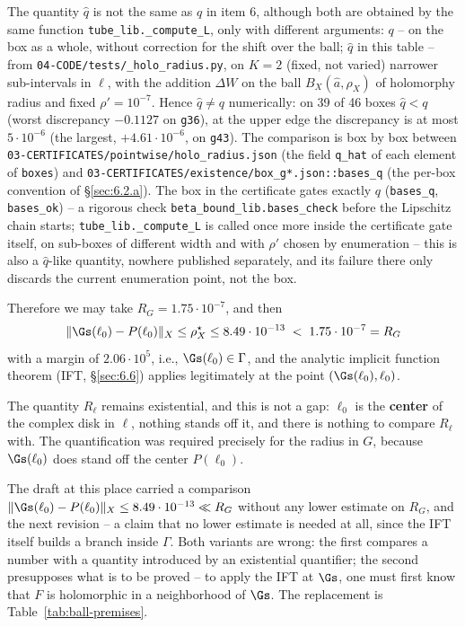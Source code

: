 The quantity $\hat q$ is not the same as $q$ in item 6, although both are obtained by the same function \texttt{tube\_\allowbreak lib.\_\allowbreak compute\_\allowbreak L}, only with different arguments: $q$ -- on the box as a whole, without correction for the shift over the ball; $\hat q$ in this table -- from \texttt{04-\allowbreak CODE/\allowbreak tests/\allowbreak \_\allowbreak holo\_\allowbreak radius.py}, on $K=2$ (fixed, not varied) narrower sub-intervals in $\ell$, with the addition $\Delta W$ on the ball $B_X(\hat a,\rho_X)$ of holomorphy radius and fixed $\rho'=10^{-7}$. Hence $\hat q\ne q$ numerically: on 39 of 46 boxes $\hat q<q$ (worst discrepancy $-0.1127$ on \texttt{g36}), at the upper edge the discrepancy is at most $5\cdot10^{-6}$ (the largest, $+4.61\cdot10^{-6}$, on \texttt{g43}). The comparison is box by box between \texttt{03-\allowbreak CERTIFICATES/\allowbreak pointwise/\allowbreak holo\_\allowbreak radius.json} (the field \texttt{q\_\allowbreak hat} of each element of \texttt{boxes}) and \texttt{03-\allowbreak CERTIFICATES/\allowbreak existence/\allowbreak box\_\allowbreak g*.json\allowbreak ::\allowbreak bases\_\allowbreak q} (the per-box convention of \S\ref{sec:6.2.a}). The box in the certificate gates exactly $q$ (\texttt{bases\_q}, \texttt{bases\_ok}) -- a rigorous check \texttt{beta\_\allowbreak bound\_\allowbreak lib.bases\_\allowbreak check} before the Lipschitz chain starts; \texttt{tube\_\allowbreak lib.\_\allowbreak compute\_\allowbreak L} is called once more inside the certificate gate itself, on sub-boxes of different width and with $\rho'$ chosen by enumeration -- this is also a $\hat q$-like quantity, nowhere published separately, and its failure there only discards the current enumeration point, not the box.

Therefore we may take $R_G=1.75\cdot10^{-7}$, and then
\[
\|\Gs(\ell_0)-P(\ell_0)\|_X\le\rho^{\star}_X\le8.49\cdot10^{-13}
\;<\;1.75\cdot10^{-7}=R_G
\]
with a margin of $2.06\cdot10^{5}$, i.e., $\Gs(\ell_0)\in\Gamma$, and
the analytic implicit function theorem (IFT, \S\ref{sec:6.6}) applies legitimately at the point $(\Gs(\ell_0),\ell_0)$.

The quantity $R_\ell$ remains existential, and this is not a gap: $\ell_0$ is the \textbf{center} of the complex disk in $\ell$, nothing stands off it, and there is nothing to compare $R_\ell$ with. The quantification was required precisely for the radius in $G$, because $\Gs(\ell_0)$ does stand off the center $P(\ell_0)$.

The draft at this place carried a comparison $\|\Gs(\ell_0)-P(\ell_0)\|_X\le8.49\cdot10^{-13}\ll R_G$ without any lower estimate on $R_G$, and the next revision -- a claim that no lower estimate is needed at all, since the IFT itself builds a branch inside $\Gamma$. Both variants are wrong: the first compares a number with a quantity introduced by an existential quantifier; the second presupposes what is to be proved -- to apply the IFT at $\Gs$, one must first know that $F$ is holomorphic in a neighborhood of $\Gs$. The replacement is Table~\ref{tab:ball-premises}.

